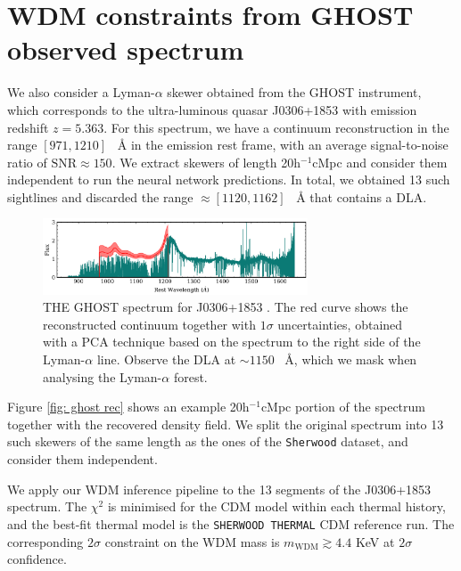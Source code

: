 \section{WDM constraints from GHOST observed spectrum}\label{sec:inference ghost}
We also consider a Lyman-$\alpha$ skewer obtained from the GHOST instrument, which corresponds to the ultra-luminous quasar J0306+1853 \cite{Wang_2015} with emission redshift $z=5.363$. For this spectrum, we have a continuum reconstruction in the range $[971, 1210]$ \textup{~\AA} in the emission rest frame, with an average signal-to-noise ratio of $\mathrm{SNR}\approx 150$. We extract skewers of length 20h$^{-1}$cMpc and consider them independent to run the neural network predictions. In total, we obtained 13 such sightlines and discarded the range $\approx [1120,1162]$ \textup{~\AA} that contains a DLA.


\begin{figure}
    \centering
    \includegraphics[width=0.7\textwidth]{img/ML/ghost_spectrum.png}
    \caption{THE GHOST spectrum for J0306+1853 \cite{Wang_2015}. The red curve shows the reconstructed continuum together with $1\sigma$ uncertainties, obtained with a PCA technique based on the spectrum to the right side of the Lyman-$\alpha$ line. Observe the DLA at $\sim 1150$ \textup{~\AA}, which we mask when analysing the Lyman-$\alpha$ forest. }
    \label{fig: ghost spectrum}
\end{figure}



Figure \ref{fig: ghost rec} shows an example 20h$^{-1}$cMpc portion of the spectrum together with the recovered density field. We split the original spectrum into 13 such skewers of the same length as the ones of the \texttt{Sherwood} dataset, and consider them independent.

We apply our WDM inference pipeline to the 13 segments of the J0306+1853 spectrum. The $\chi^2$ is minimised for the CDM model within each thermal history, and the best-fit thermal model is the \texttt{SHERWOOD THERMAL} CDM reference run. The corresponding $2\sigma$ constraint on the WDM mass is $m_{\mathrm{WDM}} \gtrsim 4.4$ KeV at $2\sigma$ confidence.




